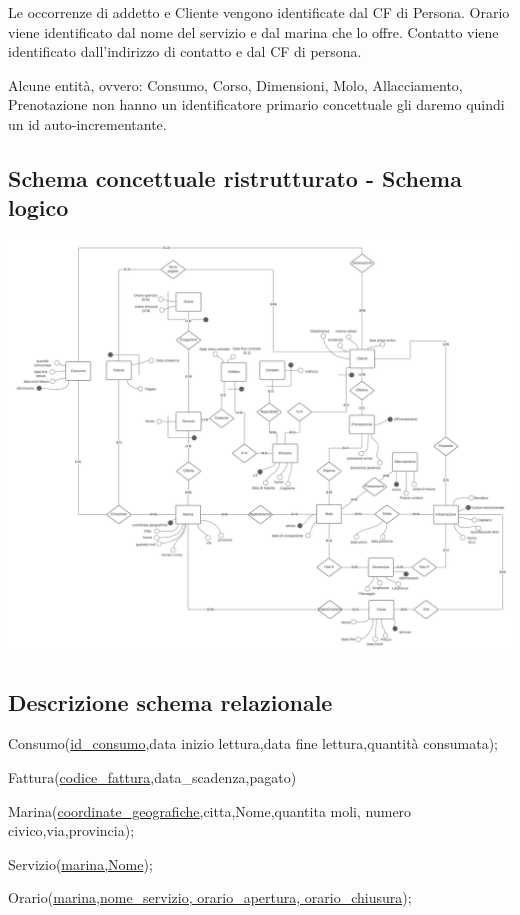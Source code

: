 Le occorrenze di addetto e Cliente vengono identificate dal CF di Persona. 
Orario viene identificato dal nome del servizio e dal marina che lo offre.
Contatto viene identificato dall'indirizzo di contatto e dal CF di persona.

Alcune entità, ovvero: Consumo, Corso, Dimensioni, Molo, Allacciamento, Prenotazione non hanno un identificatore primario concettuale gli daremo quindi un id auto-incrementante.

\subsection{Schema concettuale ristrutturato - Schema logico}
\includegraphics[width=\textwidth]{img/erlogico.png}


\subsection{Descrizione schema relazionale}

Consumo(\underline{id\_consumo},data inizio lettura,data fine lettura,quantità consumata);

Fattura(\underline{codice\_fattura},data\_scadenza,pagato) 

Marina(\underline{coordinate\_geografiche},citta,Nome,quantita moli, numero civico,via,provincia);

Servizio(\underline{marina,Nome});

Orario(\underline{marina,nome\_servizio, orario\_apertura, orario\_chiusura});

